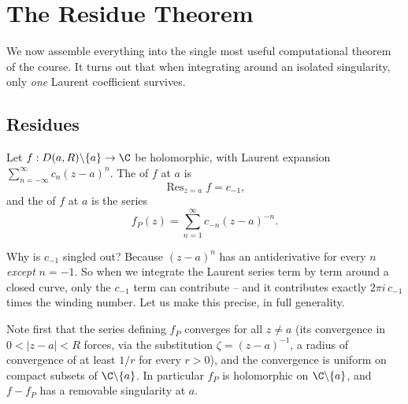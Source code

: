 \section{The Residue Theorem}

We now assemble everything into the single most useful computational theorem of the course. It turns out that when integrating around an isolated singularity, only \emph{one} Laurent coefficient survives.

\subsection{Residues}

\begin{definition}
    Let $f: D(a, R) \backslash \{a\} \rightarrow \C$ be holomorphic, with Laurent expansion $\sum_{n = -\infty}^{\infty} c_n (z - a)^n$. The  of $f$ at $a$ is
    $$
    \operatorname{Res}_{z = a} f = c_{-1},
    $$
    and the  of $f$ at $a$ is the series
    $$
    f_P(z) = \sum_{n = 1}^{\infty} c_{-n}(z - a)^{-n}.
    $$
\end{definition}

Why is $c_{-1}$ singled out? Because $(z - a)^n$ has an antiderivative for every $n$ \emph{except} $n = -1$. So when we integrate the Laurent series term by term around a closed curve, only the $c_{-1}$ term can contribute -- and it contributes exactly $2 \pi i \, c_{-1}$ times the winding number. Let us make this precise, in full generality.

Note first that the series defining $f_P$ converges for all $z \neq a$ (its convergence in $0 < |z - a| < R$ forces, via the substitution $\zeta = (z - a)^{-1}$, a radius of convergence of at least $1/r$ for every $r > 0$), and the convergence is uniform on compact subsets of $\C \backslash \{a\}$. In particular $f_P$ is holomorphic on $\C \backslash \{a\}$, and $f - f_P$ has a removable singularity at $a$.

